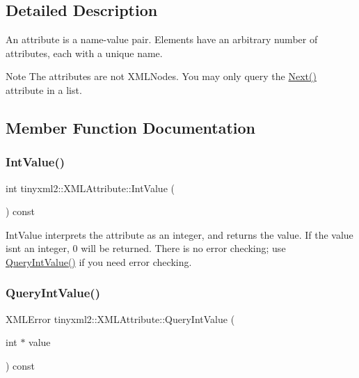 \subsection{Detailed Description}
An attribute is a name-\/value pair. Elements have an arbitrary number of attributes, each with a unique name.

\begin{DoxyNote}{Note}
The attributes are not X\+M\+L\+Nodes. You may only query the \mbox{\hyperlink{classtinyxml2_1_1_x_m_l_attribute_aee53571b21e7ce5421eb929523a8bbe6}{Next()}} attribute in a list. 
\end{DoxyNote}


\subsection{Member Function Documentation}
\mbox{\label{classtinyxml2_1_1_x_m_l_attribute_adfa2433f0fdafd5c3880936de9affa80}} 
\subsubsection{\texorpdfstring{Int\+Value()}{IntValue()}}
{\footnotesize\ttfamily int tinyxml2\+::\+X\+M\+L\+Attribute\+::\+Int\+Value (\begin{DoxyParamCaption}{ }\end{DoxyParamCaption}) const\hspace{0.3cm}{\ttfamily [inline]}}

Int\+Value interprets the attribute as an integer, and returns the value. If the value isn\textquotesingle{}t an integer, 0 will be returned. There is no error checking; use \mbox{\hyperlink{classtinyxml2_1_1_x_m_l_attribute_a6d5176260db00ea301c01af8457cd993}{Query\+Int\+Value()}} if you need error checking. \mbox{\label{classtinyxml2_1_1_x_m_l_attribute_a6d5176260db00ea301c01af8457cd993}} 
\subsubsection{\texorpdfstring{Query\+Int\+Value()}{QueryIntValue()}}
{\footnotesize\ttfamily X\+M\+L\+Error tinyxml2\+::\+X\+M\+L\+Attribute\+::\+Query\+Int\+Value (\begin{DoxyParamCaption}\item[{int $\ast$}]{value }\end{DoxyParamCaption}) const}


